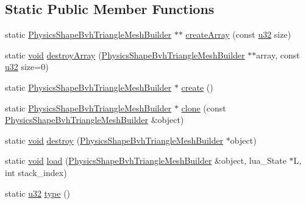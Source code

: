 \subsection*{Static Public Member Functions}
\begin{DoxyCompactItemize}
\item 
static \mbox{\hyperlink{classnjli_1_1_physics_shape_bvh_triangle_mesh_builder}{Physics\+Shape\+Bvh\+Triangle\+Mesh\+Builder}} $\ast$$\ast$ \mbox{\hyperlink{classnjli_1_1_physics_shape_bvh_triangle_mesh_builder_a7ad3378b3bb9dd8a11f510bd37cc38ac}{create\+Array}} (const \mbox{\hyperlink{_util_8h_a10e94b422ef0c20dcdec20d31a1f5049}{u32}} size)
\item 
static \mbox{\hyperlink{_thread_8h_af1e856da2e658414cb2456cb6f7ebc66}{void}} \mbox{\hyperlink{classnjli_1_1_physics_shape_bvh_triangle_mesh_builder_a1a75f574ea8a4c79ab5541e40a06be0f}{destroy\+Array}} (\mbox{\hyperlink{classnjli_1_1_physics_shape_bvh_triangle_mesh_builder}{Physics\+Shape\+Bvh\+Triangle\+Mesh\+Builder}} $\ast$$\ast$array, const \mbox{\hyperlink{_util_8h_a10e94b422ef0c20dcdec20d31a1f5049}{u32}} size=0)
\item 
static \mbox{\hyperlink{classnjli_1_1_physics_shape_bvh_triangle_mesh_builder}{Physics\+Shape\+Bvh\+Triangle\+Mesh\+Builder}} $\ast$ \mbox{\hyperlink{classnjli_1_1_physics_shape_bvh_triangle_mesh_builder_ae65c5a0d924be1661f201f35eedbe1cf}{create}} ()
\item 
static \mbox{\hyperlink{classnjli_1_1_physics_shape_bvh_triangle_mesh_builder}{Physics\+Shape\+Bvh\+Triangle\+Mesh\+Builder}} $\ast$ \mbox{\hyperlink{classnjli_1_1_physics_shape_bvh_triangle_mesh_builder_a2228084f7bb0e23ecf92b03b643c7b9c}{clone}} (const \mbox{\hyperlink{classnjli_1_1_physics_shape_bvh_triangle_mesh_builder}{Physics\+Shape\+Bvh\+Triangle\+Mesh\+Builder}} \&object)
\item 
static \mbox{\hyperlink{_thread_8h_af1e856da2e658414cb2456cb6f7ebc66}{void}} \mbox{\hyperlink{classnjli_1_1_physics_shape_bvh_triangle_mesh_builder_a4b924a758124bf67b573e7d3b8958f56}{destroy}} (\mbox{\hyperlink{classnjli_1_1_physics_shape_bvh_triangle_mesh_builder}{Physics\+Shape\+Bvh\+Triangle\+Mesh\+Builder}} $\ast$object)
\item 
static \mbox{\hyperlink{_thread_8h_af1e856da2e658414cb2456cb6f7ebc66}{void}} \mbox{\hyperlink{classnjli_1_1_physics_shape_bvh_triangle_mesh_builder_ab1244e85c5e210c389307bad6de2046d}{load}} (\mbox{\hyperlink{classnjli_1_1_physics_shape_bvh_triangle_mesh_builder}{Physics\+Shape\+Bvh\+Triangle\+Mesh\+Builder}} \&object, lua\+\_\+\+State $\ast$L, int stack\+\_\+index)
\item 
static \mbox{\hyperlink{_util_8h_a10e94b422ef0c20dcdec20d31a1f5049}{u32}} \mbox{\hyperlink{classnjli_1_1_physics_shape_bvh_triangle_mesh_builder_a5dda474ef30e475f54b1fae2bb256a9d}{type}} ()
\end{DoxyCompactItemize}

